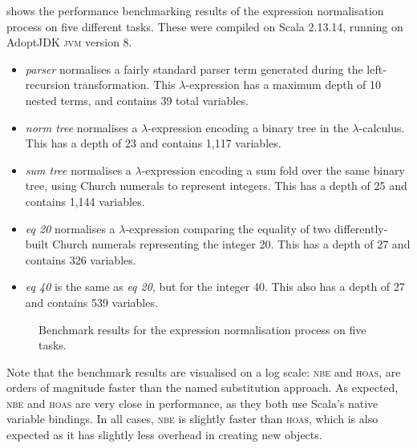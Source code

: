 \documentclass[../../main.tex]{subfiles}
\begin{document}
 shows the performance benchmarking results of the expression normalisation process on five different tasks.
These were compiled on Scala 2.13.14, running on AdoptJDK \textsc{jvm} version 8.
\begin{itemize}
  \item \emph{parser} normalises a fairly standard parser term generated during the left-recursion transformation. This $\lambda$-expression has a maximum depth of 10 nested terms, and contains 39 total variables.
  \item \emph{norm tree} normalises a $\lambda$-expression encoding a binary tree in the $\lambda$-calculus. This has a depth of 23 and contains 1,117 variables.
  \item \emph{sum tree} normalises a $\lambda$-expression encoding a sum fold over the same binary tree, using Church numerals to represent integers. This has a depth of 25 and contains 1,144 variables.
  \item \emph{eq 20} normalises a $\lambda$-expression comparing the equality of two differently-built Church numerals representing the integer 20. This has a depth of 27 and contains 326 variables.
  \item \emph{eq 40} is the same as \emph{eq 20}, but for the integer 40. This also has a depth of 27 and contains 539 variables.
\end{itemize}

\begin{figure}[htbp]
  
  \caption{Benchmark results for the expression normalisation process on five tasks.}
  \label{fig:benchmark}
\end{figure}

Note that the benchmark results are visualised on a log scale: \textsc{nbe} and \textsc{hoas}, are orders of magnitude faster than the named substitution approach.
As expected, \textsc{nbe} and \textsc{hoas} are very close in performance, as they both use Scala's native variable bindings.
In all cases, \textsc{nbe} is slightly faster than \textsc{hoas}, which is also expected as it has slightly less overhead in creating new  objects.
\end{document}
